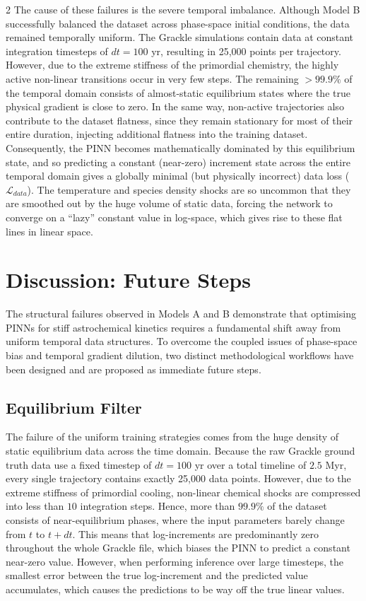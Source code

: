 \documentclass[10pt,a4paper]{article}
\begin{document}
\begin{multicols}{2}
The cause of these failures is the severe temporal imbalance. Although Model B successfully balanced the dataset across phase-space initial conditions, the data remained temporally uniform. The Grackle simulations contain data at constant integration timesteps of $dt = 100$ yr, resulting in 25,000 points per trajectory. However, due to the extreme stiffness of the primordial chemistry, the highly active non-linear transitions occur in very few steps. The remaining $>99.9\%$ of the temporal domain consists of almost-static equilibrium states where the true physical gradient is close to zero. In the same way, non-active trajectories also contribute to the dataset flatness, since they remain stationary for most of their entire duration, injecting additional flatness into the training dataset. Consequently, the PINN becomes mathematically dominated by this equilibrium state, and so predicting a constant (near-zero) increment state across the entire temporal domain gives a globally minimal (but physically incorrect) data loss ($\mathcal{L}_{data}$). The temperature and species density shocks are so uncommon that they are smoothed out by the huge volume of static data, forcing the network to converge on a ``lazy'' constant value in log-space, which gives rise to these flat lines in linear space.


\section{Discussion: Future Steps}

The structural failures observed in Models A and B demonstrate that optimising PINNs for stiff astrochemical kinetics requires a fundamental shift away from uniform temporal data structures. To overcome the coupled issues of phase-space bias and temporal gradient dilution, two distinct methodological workflows have been designed and are proposed as immediate future steps.

\subsection{Equilibrium Filter}

The failure of the uniform training strategies comes from the huge density of static equilibrium data across the time domain. Because the raw Grackle ground truth data use a fixed timestep of $dt = 100$ yr over a total timeline of $2.5$ Myr, every single trajectory contains exactly 25,000 data points. However, due to the extreme stiffness of primordial cooling, non-linear chemical shocks are compressed into less than $10$ integration steps. Hence, more than $99.9\%$ of the dataset consists of near-equilibrium phases, where the input parameters barely change from $t$ to $t+dt$. This means that log-increments are predominantly zero throughout the whole Grackle file, which biases the PINN to predict a constant near-zero value. However, when performing inference over large timesteps, the smallest error between the true log-increment and the predicted value accumulates, which causes the predictions to be way off the true linear values.


\end{multicols}
\end{document}
